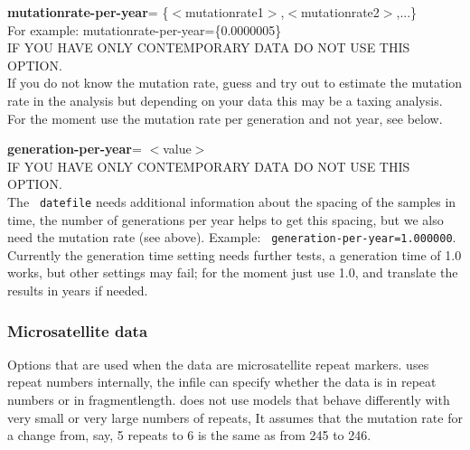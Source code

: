 \begin{description}
\item\textbf{ mutationrate-per-year}= \{$<$mutationrate1$>$,$<$mutationrate2$>$,...\}  \\
For example: mutationrate-per-year=\{0.0000005\}\\
IF YOU HAVE ONLY CONTEMPORARY DATA DO NOT USE THIS OPTION.\\
If you do not know the mutation rate, guess and try out to estimate the mutation rate in the analysis but depending on your data this may be a taxing analysis. For the moment use the mutation rate per generation and not year, see below.

\item\textbf{ generation-per-year}= $<$value$>$ \\
IF YOU HAVE ONLY CONTEMPORARY DATA DO NOT USE THIS OPTION.\\
The \texttt{ datefile} needs additional information about the spacing of the samples in time, the number of generations per year helps to get this spacing, but we also need the mutation rate (see above). 
Example: \texttt{ generation-per-year=1.000000}. Currently the generation time setting needs further tests, a generation time of 1.0 works, but other settings may fail; for the moment just use 1.0, and translate the results in years if needed.

\end{description}


\subsubsection{Microsatellite data}
Options that are used when the data are microsatellite repeat markers. \migrate uses repeat numbers internally, the infile can specify whether the data is in repeat numbers or in fragmentlength.
\migrate does not use models that behave differently with very small or very large numbers of repeats, It assumes that the mutation rate for a change from, say, 5 repeats to 6 is the same as from 245 to 246. 

